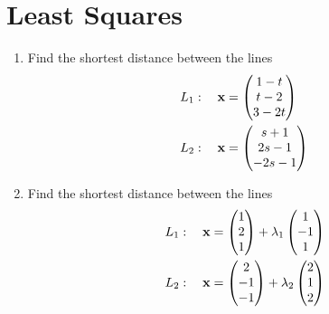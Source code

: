 \documentclass[journal,12pt,twocolumn]{IEEEtran}
\renewcommand\thesection{\arabic{section}}
\begin{document}
\section{Least Squares}
\renewcommand{\theequation}{\theenumi}
\begin{enumerate}[label=\thesection.\arabic*.,ref=\thesection.\theenumi]
\item Find the shortest distance between the lines 
\begin{align}
L_1: \quad \mathbf{x} &= \begin{pmatrix}1-t\\t-2\\3-2t\end{pmatrix} 
\\
L_2: \quad \mathbf{x} &= \begin{pmatrix}s+1\\2s-1\\-2s-1\end{pmatrix}
\end{align}
\solution
%
\item Find the shortest distance between the lines 
\begin{align}
L_1: \quad \mathbf{x} &= \begin{pmatrix}1\\2\\1\end{pmatrix} + \lambda_1\begin{pmatrix}1 \\ -1 \\1\end{pmatrix}
\\
L_2: \quad \mathbf{x} &= \begin{pmatrix}2\\-1\\-1\end{pmatrix} + \lambda_2\begin{pmatrix}2 \\ 1 \\2\end{pmatrix}
\end{align}
\solution
%
\end{enumerate}
\end{document}
